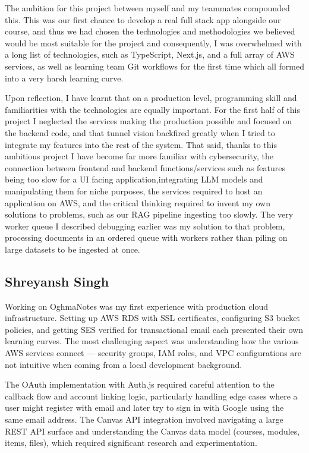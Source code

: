 \documentclass[12pt,a4paper]{article}
\begin{document}
The ambition for this project between myself and my teammates compounded this. This was our first chance to develop a real full stack app alongside our course, and thus we had chosen the technologies and methodologies we believed would be most suitable for the project and consequently, I was overwhelmed with a long list of technologies, such as TypeScript, Next.js, and a full array of AWS services, as well as learning team Git workflows for the first time which all formed into a very harsh learning curve.

Upon reflection, I have learnt that on a production level, programming skill and familiarities with the technologies are equally important. For the first half of this project I neglected the services making the production possible and focused on the backend code, and that tunnel vision backfired greatly when I tried to integrate my features into the rest of the system.
That said, thanks to this ambitious project I have become far more familiar with cybersecurity, the connection between frontend and backend functions/services such as features being too slow for a UI facing application,integrating LLM models and manipulating them for niche purposes, the services required to host an application on AWS, and the critical thinking required to invent my own solutions to problems, such as our RAG pipeline ingesting too slowly.
The very worker queue I described debugging earlier was my solution to that problem, processing documents in an ordered queue with workers rather than piling on large datasets to be ingested at once.


\subsection{Shreyansh Singh}

Working on OghmaNotes was my first experience with production cloud infrastructure. Setting up AWS RDS with SSL certificates, configuring S3 bucket policies, and getting SES verified for transactional email each presented their own learning curves. The most challenging aspect was understanding how the various AWS services connect --- security groups, IAM roles, and VPC configurations are not intuitive when coming from a local development background.

The OAuth implementation with Auth.js required careful attention to the callback flow and account linking logic, particularly handling edge cases where a user might register with email and later try to sign in with Google using the same email address. The Canvas API integration involved navigating a large REST API surface and understanding the Canvas data model (courses, modules, items, files), which required significant research and experimentation.
\end{document}
